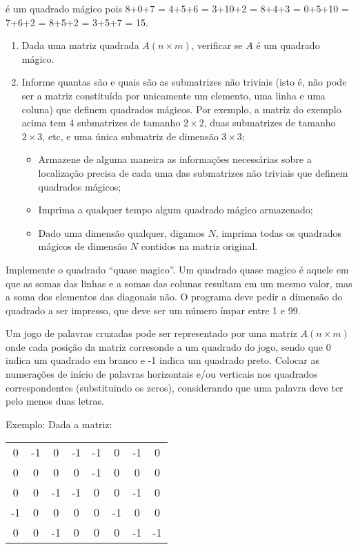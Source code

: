 é um quadrado mágico pois 
8+0+7 = 4+5+6 = 3+10+2 = 8+4+3 = 0+5+10 = 7+6+2 = 8+5+2 = 3+5+7 = 15.

\begin{enumerate}
\item Dada  uma matriz  quadrada  $A (n \times m)$,  
verificar  se $A$  é um  quadrado mágico. 
\item Informe quantas são e quais são as submatrizes não triviais
      (isto é, não pode ser a matriz constituída por unicamente um elemento, 
      uma linha e uma coluna) que definem quadrados mágicos. 
      Por exemplo, a matriz do exemplo acima
      tem 4 submatrizes de tamanho $2 \times 2$, duas submatrizes de 
      tamanho $2 \times 3$, etc, e uma única submatriz de dimensão
      $3 \times 3$;
\begin{itemize}
\item Armazene de alguma maneira as 
      informações necessárias sobre a localização precisa de cada uma das 
      submatrizes não triviais que definem quadrados mágicos;
\item Imprima a qualquer tempo algum quadrado mágico armazenado;
\item Dado uma dimensão qualquer, digamos $N$, imprima todas os 
      quadrados mágicos de dimensão $N$ contidos na matriz original.
\end{itemize}
\end{enumerate}


\item Implemente o quadrado ``quase magico''.  
Um quadrado quase magico é aquele em que as somas das linhas e a somas das
colunas resultam em um mesmo valor, mas a soma dos elementos das 
diagonais não.  O programa deve pedir a dimensão do
quadrado a ser impresso, que deve ser um número ímpar entre 1 e 99.



\item Um jogo  de palavras cruzadas pode ser representado  por uma matriz $A
(n \times  m)$ onde cada posição da  matriz corresonde a um  quadrado do jogo,
sendo  que 0  indica  um quadrado  em  branco e  -1  indica um  quadrado
preto.  Colocar as  numerações de  início de  palavras  horizontais e/ou
verticais  nos   quadrados  correspondentes  (substituindo   os  zeros),
considerando que uma palavra deve ter pelo menos duas letras. 

Exemplo: Dada a matriz:
\begin{center}
\begin{tabular}{cccccccc}
 0 & -1 &  0 & -1 & -1 &  0 & -1 &  0 \\
 0 &  0 &  0 &  0 & -1 &  0 &  0 &  0 \\
 0 &  0 & -1 & -1 &  0 &  0 & -1 &  0\\
-1 &  0 &  0 &  0 &  0 & -1 &  0 &  0\\
 0 &  0 & -1 &  0 &  0 &  0 & -1 & -1\\
\end{tabular}
\end{center}


